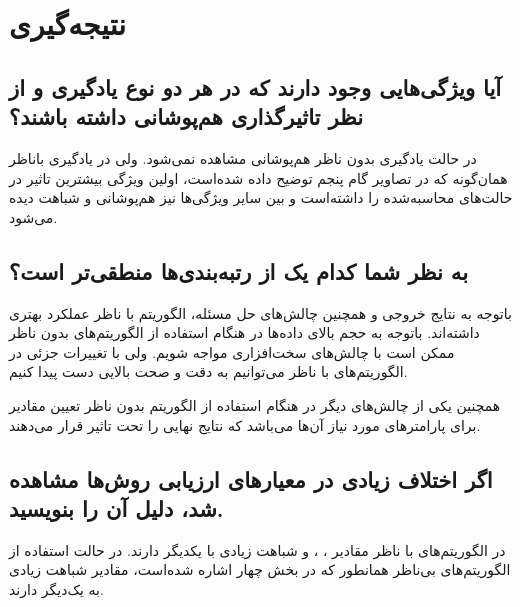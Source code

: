 \documentclass{article}
\begin{document}
\newpage
\section{نتیجه‌گیری}
\subsection{آیا ویژگی‌هایی وجود دارند که در هر دو نوع یادگیری  و  از نظر تاثیرگذاری هم‌پوشانی داشته باشند؟}
در حالت یادگیری بدون ناظر هم‌پوشانی مشاهده نمی‌شود. ولی در یادگیری باناظر همان‌گونه که در تصاویر گام پنجم توضیح داده شده‌است، اولین ویژگی بیشترین تاثیر در حالت‌های محاسبه‌شده را داشته‌است و بین سایر ویژگی‌ها نیز هم‌پوشانی و شباهت دیده می‌شود.
\subsection{به نظر شما کدام یک از رتبه‌بندی‌ها منطقی‌تر است؟}
باتوجه به نتایج خروجی و همچنین چالش‌های حل مسئله، الگوریتم با ناظر عملکرد بهتری داشته‌اند. باتوجه به‌ حجم بالای داده‌ها در هنگام استفاده از الگوریتم‌های بدون ناظر ممکن است با چالش‌های سخت‌افزاری مواجه شویم. ولی با تغییرات جزئی در الگوریتم‌های با ناظر می‌توانیم به دقت و صحت بالایی دست پیدا کنیم.

همچنین یکی از چالش‌های دیگر در هنگام استفاده از الگوریتم بدون ناظر تعیین مقادیر برای پارامترهای مورد نیاز آن‌ها می‌باشد که نتایج نهایی را تحت تاثیر قرار می‌دهند.
\subsection{اگر اختلاف زیادی در معیارهای ارزیابی روش‌ها مشاهده شد، دلیل آن را بنویسید.}
در الگوریتم‌های با ناظر مقادیر ، ،  و  شباهت زیادی با یکدیگر دارند.
در حالت استفاده از الگوریتم‌های بی‌ناظر همانطور که در بخش چهار اشاره شده‌است، مقادیر  شباهت زیادی به یک‌دیگر دارند.
\newpage
\end{document}
